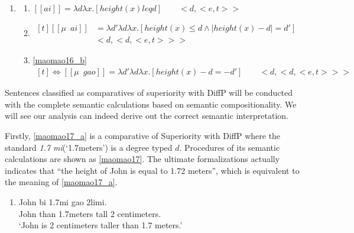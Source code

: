 \documentclass{ctexart}
\begin{document}
\begin{enumerate}
    \item \label{maomao16}
    \begin{enumerate}
        \item \label{maomao16_a}
        $[\![ai]\!] = \lambda d \lambda x.[height(x) leq d] \qquad <d,<e,t>>$

        \item \label{maomao16_b}
        $\begin{aligned}[t]
            [\![\mu \enspace ai]\!] &= \lambda d' \lambda d \lambda x.[height(x) \leq d \land |height(x) - d|=d'] \\
            & <d,<d,<e,t>>>
        \end{aligned}$
        
        \item \label{maomao16_c}
        \ref{maomao16_b}
        $\begin{aligned}[t]
            \Leftrightarrow [\![\mu \enspace gao]\!] = \lambda d' \lambda d \lambda x.[height(x)-d=-d'] \qquad <d,<d,<e,t>>>
        \end{aligned}$
    \end{enumerate}
\end{enumerate}

Sentences classified as comparatives of superiority with DiffP will be conducted with the complete semantic calculations based on semantic compositionality. We will see our analysis can indeed derive out the correct semantic interpretation.

Firstly, \ref{maomao17_a} is a comparative of Superiority with DiffP where the standard \textit{1.7 mi}(`1.7meters') is a degree typed $d$. Procedures of its semantic calculations are shown as \ref{maomao17}. The ultimate formalizations actually indicates that ``the height of John is equal to 1.72 meters'', which is equivalent to the meaning of \ref{maomao17_a}.

\begin{enumerate}
    \item \label{maomao17_a}
    John bi \enspace \enspace 1.7mi \enspace \enspace \enspace \enspace gao \enspace \enspace 2limi. \\
    John than 1.7meters tall 2 centimeters. \\
    `John is 2 centimeters taller than 1.7 meters.'
\end{enumerate}
\end{document}
